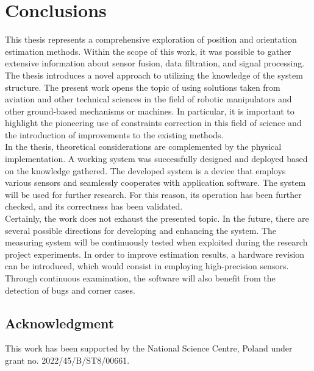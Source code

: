 \chapter{Conclusions}

This thesis represents a comprehensive exploration of position and orientation estimation methods. Within the scope of this work, it was possible to gather extensive information about sensor fusion, data filtration, and signal processing. The thesis introduces a novel approach to utilizing the knowledge of the system structure. The present work opens the topic of using solutions taken from aviation and other technical sciences in the field of robotic manipulators and other ground-based mechanisms or machines. In particular, it is important to highlight the pioneering use of constraints correction in this field of science and the introduction of improvements to the existing methods.\\

In the thesis, theoretical considerations are complemented by the physical implementation. A working system was successfully designed and deployed based on the knowledge gathered. The developed system is a device that employs various sensors and seamlessly cooperates with application software. The system will be used for further research. For this reason, its operation has been further checked, and its correctness has been validated.\\

Certainly, the work does not exhaust the presented topic. In the future, there are several possible directions for developing and enhancing the system. The measuring system will be continuously tested when exploited during the research project experiments. In order to improve estimation results, a hardware revision can be introduced, which would consist in employing high-precision sensors. Through continuous examination, the software will also benefit from the detection of bugs and corner cases.\\


\section*{Acknowledgment}

This work has been supported by the National Science Centre, Poland under grant no. 2022/45/B/ST8/00661.



